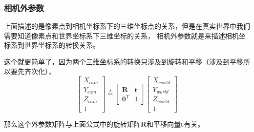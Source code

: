 \documentclass[12pt]{article}
\begin{document}
\subsubsection{相机外参数}
上面描述的是像素点到相机坐标系下的三维坐标点的关系，但是在真实世界中我们需要知道像素点和世界坐标系下三维坐标的关系，
相机外参数就是来描述相机坐标系到世界坐标系的转换关系。

这个就更简单了，因为两个三维坐标系的转换只涉及到旋转和平移（涉及到平移所以要先齐次化），
\begin{equation}
    \left[\begin{array}{l}
        X_{cam} \\
        Y_{cam} \\
        Z_{cam} \\
        1
        \end{array}\right]\overset{\lambda}{=}\left[\begin{array}{ll}
        \mathbf{R} & \mathbf{t} \\
        \mathbf{0}^{T} & 1
        \end{array}\right]\left[\begin{array}{c}
        X_{world} \\
        Y_{world} \\
        Z_{world} \\
        1
        \end{array}\right]
\end{equation}

那么这个外参数矩阵与上面公式中的旋转矩阵$\mathbf{R}$和平移向量$\mathbf{t}$有关。
\end{document}
